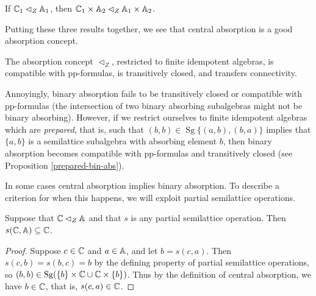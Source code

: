 \documentclass[letterpaper,11pt]{article}
\DeclareMathOperator{\Sg}{Sg}
\begin{document}
\begin{prop} If $\mathbb{C}_1 \lhd_Z \mathbb{A}_1$, then $\mathbb{C}_1 \times \mathbb{A}_2 \lhd_Z \mathbb{A}_1 \times \mathbb{A}_2$.
\end{prop}

Putting these three results together, we see that central absorption is a good absorption concept.

\begin{prop} The absorption concept $\lhd_Z$, restricted to finite idempotent algebras, is compatible with pp-formulas, is transitively closed, and transfers connectivity.
\end{prop}

\begin{rem} Annoyingly, binary absorption fails to be transitively closed or compatible with pp-formulas (the intersection of two binary absorbing subalgebras might not be binary absorbing). However, if we restrict ourselves to finite idempotent algebras which are \emph{prepared}, that is, such that $(b,b) \in \Sg\{(a,b),(b,a)\}$ implies that $\{a,b\}$ is a semilattice subalgebra with absorbing element $b$, then binary absorption becomes compatible with pp-formulas and transitively closed (see Proposition \ref{prepared-bin-abs}).
\end{rem}

In some cases central absorption implies binary absorption. To describe a criterion for when this happens, we will exploit partial semilattice operations.

\begin{prop} Suppose that $\mathbb{C} \lhd_Z \mathbb{A}$ and that $s$ is any partial semilattice operation. Then $s(\mathbb{C},\mathbb{A}) \subseteq \mathbb{C}$.
\end{prop}
\begin{proof} Suppose $c \in \mathbb{C}$ and $a \in \mathbb{A}$, and let $b = s(c,a)$. Then $s(c,b) = s(b,c) = b$ by the defining property of partial semilattice operations, so $(b,b) \in \Sg(\{b\}\times \bC \cup \bC \times \{b\})$. Thus by the definition of central absorption, we have $b \in \mathbb{C}$, that is, $s(c,a) \in \mathbb{C}$.
\end{proof}
\end{document}
